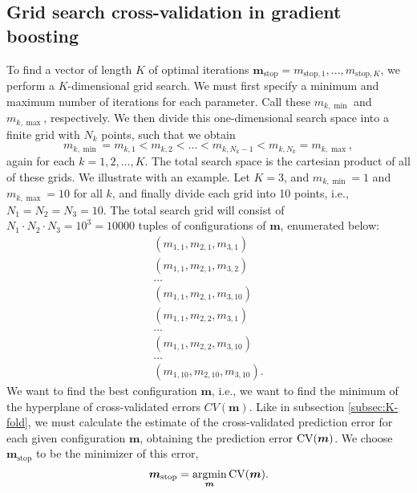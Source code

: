 \subsection{Grid search cross-validation in gradient boosting}\label{grid-search}
To find a vector of length $K$ of optimal iterations $\boldsymbol{m}_{\text{stop}}=m_{\text{stop},1},\ldots,m_{\text{stop},K}$, we perform a $K$-dimensional grid search.
We must first specify a minimum and maximum number of iterations for each parameter.
Call these $m_{k,\min}$ and $m_{k,\max}$, respectively.
We then divide this one-dimensional search space into a finite grid with $N_k$ points, such that we obtain
\begin{equation*} 
    m_{k,\min}=m_{k,1}<m_{k,2}<\ldots<m_{k,N_k-1}<m_{k,N_k}=m_{k,\max},
\end{equation*}
again for each $k=1,2,\ldots,K$.
The total search space is the cartesian product of all of these grids.
We illustrate with an example. Let $K=3$, and $m_{k,\min}=1$ and $m_{k,\max}=10$ for all $k$, and finally divide each grid into 10 points, i.e., $N_1=N_2=N_3=10$.
The total search grid will consist of $N_1\cdot N_2\cdot N_3=10^3=10000$ tuples of configurations of $\boldsymbol{m}$, enumerated below:
\begin{align*}
    \left(m_{1,1},m_{2,1},m_{3,1}\right) \\
    \left(m_{1,1},m_{2,1},m_{3,2}\right) \\
    \ldots \\
    \left(m_{1,1},m_{2,1},m_{3,10}\right) \\
    \left(m_{1,1},m_{2,2},m_{3,1}\right) \\
    \ldots \\
    \left(m_{1,1},m_{2,2},m_{3,10}\right) \\
    \ldots \\
    \left(m_{1,10},m_{2,10},m_{3,10}\right).
\end{align*}
We want to find the best configuration $\boldsymbol{m}$, i.e., we want to find the minimum of the hyperplane of cross-validated errors $CV(\boldsymbol{m})$.
Like in subsection \ref{subsec:K-fold}, we must calculate the estimate of the cross-validated prediction error for each given configuration $\boldsymbol{m}$, obtaining the prediction error $\operatorname{CV}(\boldsymbol{m})$.
We choose $\boldsymbol{m}_{\text{stop}}$ to be the minimizer of this error,
\begin{equation*}
    \boldsymbol{m}_{\text{stop}}=\operatorname*{argmin}_{\boldsymbol{m}}\operatorname{CV}(\boldsymbol{m}).
\end{equation*}
